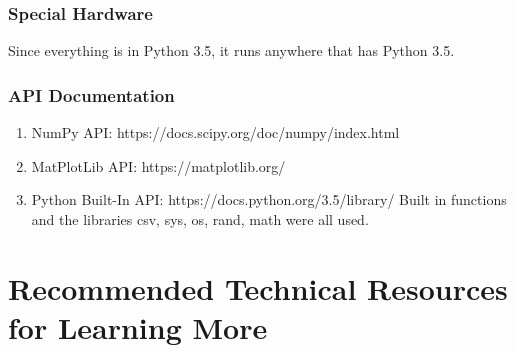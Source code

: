 \documentclass[10pt,journal,compsoc, draftclsnofoot,onecolumn]{IEEEtran}
\begin{document}
\subsubsection{Special Hardware}
Since everything is in Python 3.5, it runs anywhere that has Python 3.5.

\subsubsection{API Documentation}
\begin{enumerate}
\item NumPy API: https://docs.scipy.org/doc/numpy/index.html

\noindent
\item MatPlotLib API: https://matplotlib.org/

\noindent
\item Python Built-In API: https://docs.python.org/3.5/library/
Built in functions and the libraries csv, sys, os, rand, math were all used.

\end{enumerate}

\newpage
\section{Recommended Technical Resources for Learning More}
\end{document}
